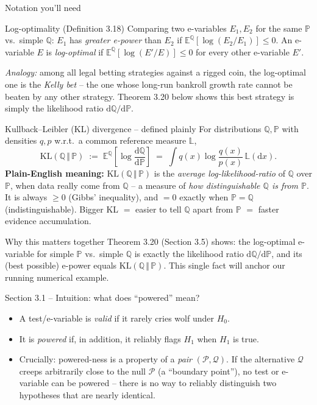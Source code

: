 \documentclass[aspectratio=169,10pt]{beamer}
\newcommand{\PP}{\mathbb{P}}
\newcommand{\QQ}{\mathbb{Q}}
\newcommand{\EE}{\mathbb{E}}
\newcommand{\calP}{\mathcal{P}}
\newcommand{\calQ}{\mathcal{Q}}
\newcommand{\KL}[2]{\mathrm{KL}(#1 \,\Vert\, #2)}
\begin{document}
\begin{frame}[allowframebreaks]{Notation you'll need}
  \framebreak

  \begin{block}{Log-optimality (Definition 3.18)}
    Comparing two e-variables $E_1,E_2$ for the same $\PP$ vs.\ simple $\QQ$: $E_1$ has \emph{greater e-power} than $E_2$ if $\EE^\QQ[\log(E_2/E_1)]\le 0$. An e-variable $E$ is \emph{log-optimal} if $\EE^\QQ[\log(E'/E)]\le 0$ for every other e-variable $E'$.

    \emph{Analogy:} among all legal betting strategies against a rigged coin, the log-optimal one is the \emph{Kelly bet} -- the one whose long-run bankroll growth rate cannot be beaten by any other strategy. Theorem 3.20 below shows this best strategy is simply the likelihood ratio $\mathrm{d}\QQ/\mathrm{d}\PP$.
  \end{block}

  \begin{block}{Kullback--Leibler (KL) divergence -- defined plainly}
    For distributions $\QQ,\PP$ with densities $q,p$ w.r.t.\ a common reference measure $\mathbb{L}$,
    \[
      \KL{\QQ}{\PP} \;:=\; \EE^\QQ\!\left[\log\frac{\mathrm{d}\QQ}{\mathrm{d}\PP}\right] \;=\; \int q(x)\log\frac{q(x)}{p(x)}\,\mathbb{L}(\mathrm{d}x).
    \]
    \textbf{Plain-English meaning:} $\KL{\QQ}{\PP}$ is the \emph{average log-likelihood-ratio} of $\QQ$ over $\PP$, when data really come from $\QQ$ -- a measure of \emph{how distinguishable $\QQ$ is from $\PP$}. It is always $\ge 0$ (Gibbs' inequality), and $=0$ exactly when $\PP=\QQ$ (indistinguishable). Bigger KL $=$ easier to tell $\QQ$ apart from $\PP$ $=$ faster evidence accumulation.
  \end{block}

  \begin{block}{Why this matters together}
    Theorem 3.20 (Section 3.5) shows: the log-optimal e-variable for simple $\PP$ vs.\ simple $\QQ$ is exactly the likelihood ratio $\mathrm{d}\QQ/\mathrm{d}\PP$, and its (best possible) e-power equals $\KL{\QQ}{\PP}$. This single fact will anchor our running numerical example.
  \end{block}
\end{frame}

\begin{frame}{Section 3.1 -- Intuition: what does ``powered'' mean?}
  \begin{itemize}
    \item A test/e-variable is \emph{valid} if it rarely cries wolf under $H_0$.
    \item It is \emph{powered} if, in addition, it reliably flags $H_1$ when $H_1$ is true.
    \item Crucially: powered-ness is a property of a \emph{pair} $(\calP,\calQ)$. If the alternative $\calQ$ creeps arbitrarily close to the null $\calP$ (a ``boundary point''), no test or e-variable can be powered -- there is no way to reliably distinguish two hypotheses that are nearly identical.
  \end{itemize}
\end{frame}
\end{document}

